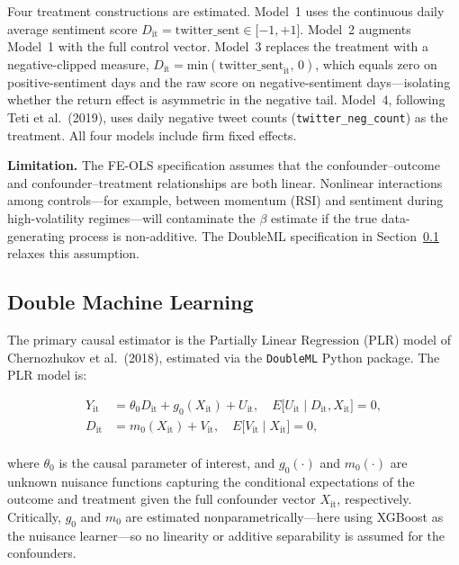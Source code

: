 Four treatment constructions are estimated. Model~1 uses the continuous
daily average sentiment score
\(D_{\text{it}} = \text{twitter\_sent} \in \lbrack - 1, + 1\rbrack\).
Model~2 augments Model~1 with the full control vector. Model~3 replaces
the treatment with a negative-clipped measure,
\(D_{\text{it}} = \text{min}(\text{twitter\_sent}_{\text{it}},\, 0)\),
which equals zero on positive-sentiment days and the raw score on
negative-sentiment days---isolating whether the return effect is
asymmetric in the negative tail. Model~4, following Teti et al.\ (2019),
uses daily negative tweet counts (\texttt{twitter\_neg\_count}) as the
treatment. All four models include firm fixed effects.

\textbf{Limitation.} The FE-OLS specification assumes that the
confounder--outcome and confounder--treatment relationships are both
linear. Nonlinear interactions among controls---for example, between
momentum (RSI) and sentiment during high-volatility regimes---will
contaminate the \(\beta\) estimate if the true data-generating process
is non-additive. The DoubleML specification in
Section~\ref{double-machine-learning} relaxes this
assumption.

\subsection{Double Machine Learning}\label{double-machine-learning}

The primary causal estimator is the Partially Linear Regression (PLR)
model of Chernozhukov et al.\ (2018), estimated via the \texttt{DoubleML}
Python package. The PLR model is:

\[\begin{matrix}
Y_{\text{it}} & = \theta_{0}D_{\text{it}} + g_{0}(X_{\text{it}}) + U_{\text{it}},\quad E\lbrack U_{\text{it}} \mid D_{\text{it}},X_{\text{it}}\rbrack = 0, \\
D_{\text{it}} & = m_{0}(X_{\text{it}}) + V_{\text{it}},\quad E\lbrack V_{\text{it}} \mid X_{\text{it}}\rbrack = 0, \\
\end{matrix}\]

where \(\theta_{0}\) is the causal parameter of interest, and
\(g_{0}( \cdot )\) and \(m_{0}( \cdot )\) are unknown nuisance functions
capturing the conditional expectations of the outcome and treatment
given the full confounder vector \(X_{\text{it}}\), respectively.
Critically, \(g_{0}\) and \(m_{0}\) are estimated
nonparametrically---here using XGBoost as the nuisance learner---so no
linearity or additive separability is assumed for the confounders.

